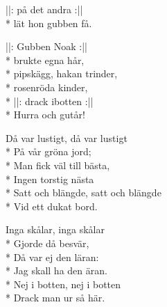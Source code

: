 \begin{SongText}
\begin{SongVerse}
        ||: på det andra :||\\*%
        lät hon gubben få.
    \end{SongVerse}
    \begin{SongVerse}
        ||: Gubben Noak :||\\*%
        brukte egna hår,\\*%
        pipskägg, hakan trinder,\\*%
        rosenröda kinder,\\*%
        ||: drack ibotten :||\\*%
        Hurra och gutår!
    \end{SongVerse}
    \begin{SongVerse}
        Då var lustigt, då var lustigt\\*%
        På vår gröna jord;\\*%
        Man fick väl till bästa,\\*%
        Ingen torstig nästa\\*%
        Satt och blängde, satt och blängde\\*%
        Vid ett dukat bord.
    \end{SongVerse}
    \begin{SongVerse}
        Inga skålar, inga skålar\\*%
        Gjorde då besvär,\\*%
        Då var ej den läran:\\*%
        Jag skall ha den äran.\\*%
        Nej i botten, nej i botten\\*%
        Drack man ur så här.
    \end{SongVerse}
\end{SongText}
